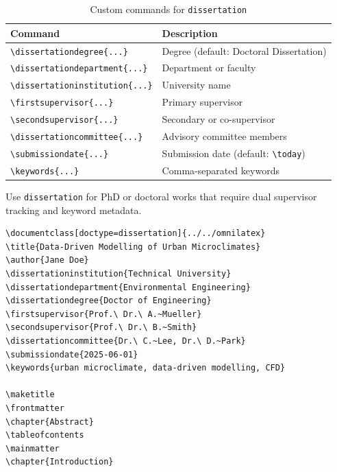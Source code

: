 \begin{table}[htbp]
    \centering
    \caption{Custom commands for \texttt{dissertation}}
    \label{tab:dissertation-commands}
    \begin{tabular}{@{} l p{8cm} @{}}
        \toprule
        \textbf{Command} & \textbf{Description} \\
        \midrule
        \texttt{\textbackslash dissertationdegree\{...\}}        & Degree (default: Doctoral Dissertation) \\
        \texttt{\textbackslash dissertationdepartment\{...\}}     & Department or faculty \\
        \texttt{\textbackslash dissertationinstitution\{...\}}   & University name \\
        \texttt{\textbackslash firstsupervisor\{...\}}           & Primary supervisor \\
        \texttt{\textbackslash secondsupervisor\{...\}}          & Secondary or co-supervisor \\
        \texttt{\textbackslash dissertationcommittee\{...\}}     & Advisory committee members \\
        \texttt{\textbackslash submissiondate\{...\}}            & Submission date (default: \texttt{\textbackslash today}) \\
        \texttt{\textbackslash keywords\{...\}}                  & Comma-separated keywords \\
        \bottomrule
    \end{tabular}
\end{table}

Use \texttt{dissertation} for PhD or doctoral works that require dual
supervisor tracking and keyword metadata.

\begin{verbatim}
\documentclass[doctype=dissertation]{../../omnilatex}
\title{Data-Driven Modelling of Urban Microclimates}
\author{Jane Doe}
\dissertationinstitution{Technical University}
\dissertationdepartment{Environmental Engineering}
\dissertationdegree{Doctor of Engineering}
\firstsupervisor{Prof.\ Dr.\ A.~Mueller}
\secondsupervisor{Prof.\ Dr.\ B.~Smith}
\dissertationcommittee{Dr.\ C.~Lee, Dr.\ D.~Park}
\submissiondate{2025-06-01}
\keywords{urban microclimate, data-driven modelling, CFD}

\maketitle
\frontmatter
\chapter{Abstract}
\tableofcontents
\mainmatter
\chapter{Introduction}

\end{verbatim}


